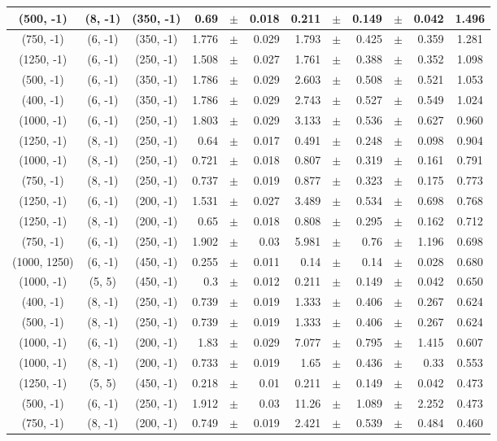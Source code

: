 \documentclass[12pt]{paper}
\begin{document}
\begin{table}[ht]
\begin{center}
{\begin{tabular}{|c|c|c|rrr|rrrrr|c|}
(500, -1)&(8, -1)&(350, -1)&0.69&$\pm$&0.018&0.211&$\pm$&0.149&$\pm$&0.042&1.496\\\hline
(750, -1)&(6, -1)&(350, -1)&1.776&$\pm$&0.029&1.793&$\pm$&0.425&$\pm$&0.359&1.281\\\hline
(1250, -1)&(6, -1)&(250, -1)&1.508&$\pm$&0.027&1.761&$\pm$&0.388&$\pm$&0.352&1.098\\\hline
(500, -1)&(6, -1)&(350, -1)&1.786&$\pm$&0.029&2.603&$\pm$&0.508&$\pm$&0.521&1.053\\\hline
(400, -1)&(6, -1)&(350, -1)&1.786&$\pm$&0.029&2.743&$\pm$&0.527&$\pm$&0.549&1.024\\\hline
(1000, -1)&(6, -1)&(250, -1)&1.803&$\pm$&0.029&3.133&$\pm$&0.536&$\pm$&0.627&0.960\\\hline
(1250, -1)&(8, -1)&(250, -1)&0.64&$\pm$&0.017&0.491&$\pm$&0.248&$\pm$&0.098&0.904\\\hline
(1000, -1)&(8, -1)&(250, -1)&0.721&$\pm$&0.018&0.807&$\pm$&0.319&$\pm$&0.161&0.791\\\hline
(750, -1)&(8, -1)&(250, -1)&0.737&$\pm$&0.019&0.877&$\pm$&0.323&$\pm$&0.175&0.773\\\hline
(1250, -1)&(6, -1)&(200, -1)&1.531&$\pm$&0.027&3.489&$\pm$&0.534&$\pm$&0.698&0.768\\\hline
(1250, -1)&(8, -1)&(200, -1)&0.65&$\pm$&0.018&0.808&$\pm$&0.295&$\pm$&0.162&0.712\\\hline
(750, -1)&(6, -1)&(250, -1)&1.902&$\pm$&0.03&5.981&$\pm$&0.76&$\pm$&1.196&0.698\\\hline
(1000, 1250)&(6, -1)&(450, -1)&0.255&$\pm$&0.011&0.14&$\pm$&0.14&$\pm$&0.028&0.680\\\hline
(1000, -1)&(5, 5)&(450, -1)&0.3&$\pm$&0.012&0.211&$\pm$&0.149&$\pm$&0.042&0.650\\\hline
(400, -1)&(8, -1)&(250, -1)&0.739&$\pm$&0.019&1.333&$\pm$&0.406&$\pm$&0.267&0.624\\\hline
(500, -1)&(8, -1)&(250, -1)&0.739&$\pm$&0.019&1.333&$\pm$&0.406&$\pm$&0.267&0.624\\\hline
(1000, -1)&(6, -1)&(200, -1)&1.83&$\pm$&0.029&7.077&$\pm$&0.795&$\pm$&1.415&0.607\\\hline
(1000, -1)&(8, -1)&(200, -1)&0.733&$\pm$&0.019&1.65&$\pm$&0.436&$\pm$&0.33&0.553\\\hline
(1250, -1)&(5, 5)&(450, -1)&0.218&$\pm$&0.01&0.211&$\pm$&0.149&$\pm$&0.042&0.473\\\hline
(500, -1)&(6, -1)&(250, -1)&1.912&$\pm$&0.03&11.26&$\pm$&1.089&$\pm$&2.252&0.473\\\hline
(750, -1)&(8, -1)&(200, -1)&0.749&$\pm$&0.019&2.421&$\pm$&0.539&$\pm$&0.484&0.460\\\hline

\end{tabular}}
\end{center}
\end{table}
\end{document}
